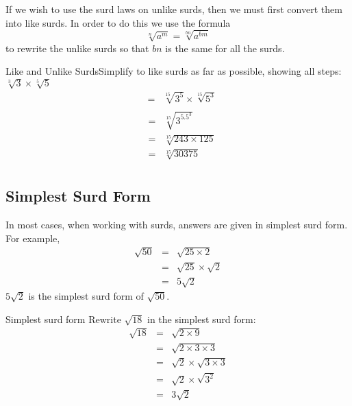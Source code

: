 If we wish to use the surd laws on unlike surds, then we must first convert
them into like surds. In order to do this we use the formula
\begin{equation} 
\label{eq:mn:s:like}
\sqrt[n]{a^m}=\sqrt[bn]{a^{bm}}
\end{equation}
to rewrite the unlike surds so that $bn$ is the same for all the surds.

\begin{wex}{Like and Unlike Surds}{Simplify to like surds as far as possible, showing all steps:  $\sqrt[3]{3}\times \sqrt[5]{5}$}{
\begin{eqnarray*}
&=&\sqrt[15]{3^5}\times \sqrt[15]{5^3}\\
\end{eqnarray*}
\begin{eqnarray*}
&=&\sqrt[15]{3^5.5^3}\\
&=&\sqrt[15]{243\times 125}\\
&=&\sqrt[15]{30 375}\\
\end{eqnarray*}
}
\end{wex}

\subsection{Simplest Surd Form}
In most cases, when working with surds, answers are given in simplest surd form.
For example,
\begin{eqnarray*}
\sqrt{50} &=& \sqrt{25 \times 2}\\
&=& \sqrt{25}\times \sqrt{2}\\
&=& 5\sqrt{2}
\end{eqnarray*}
$5\sqrt{2}$ is the simplest surd form of $\sqrt{50}$.

\begin{wex}{Simplest surd form}
{Rewrite $\sqrt{18}$ in the simplest surd form:}{
\begin{eqnarray*}
\sqrt{18} &=& \sqrt{2\times 9}\\
&=& \sqrt{2\times 3\times 3}\\
&=& \sqrt{2}\times \sqrt{3\times 3}\\
&=& \sqrt{2}\times \sqrt{3^{2}}\\
&=& 3\sqrt{2}
\end{eqnarray*}
}
\end{wex}

